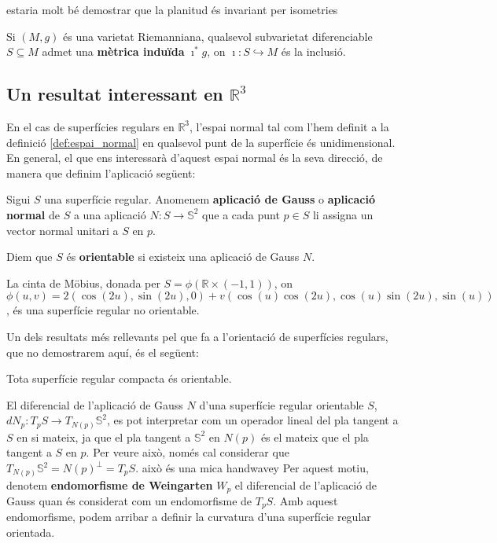 {\color{blue} estaria molt bé demostrar que la planitud és invariant per isometries}

Si $(M,g)$ és una varietat Riemanniana, qualsevol subvarietat diferenciable $S\subseteq M$ admet una \textbf{mètrica induïda} $\imath^*g$, on $\imath:S\hookrightarrow M$ és la inclusió.


\subsection{Un resultat interessant en $\mathbb R^3$}

En el cas de superfícies regulars en $\mathbb R^3$, l'espai normal tal com l'hem definit a la definició \ref{def:espai_normal} en qualsevol punt de la superfície és unidimensional. En general, el que ens interessarà d'aquest espai normal és la seva direcció, de manera que definim l'aplicació següent:
\begin{defi}
    Sigui $S$ una superfície regular. Anomenem \textbf{aplicació de Gauss} o \textbf{aplicació normal} de $S$ a una aplicació $N:S\to \mathbb S^2$ que a cada punt $p\in S$ li assigna un vector normal unitari a $S$ en $p$.
\end{defi}
Diem que $S$ és \textbf{orientable} si existeix una aplicació de Gauss $N$.
\begin{ex}
    La cinta de Möbius, donada per $S=\phi(\mathbb R \times (-1,1))$, on $\phi(u,v) = 2(\cos(2u), \sin(2u), 0) + v(\cos(u)\cos(2u), \cos(u)\sin(2u), \sin(u))$, és una superfície regular no orientable.
\end{ex}
Un dels resultats més rellevants pel que fa a l'orientació de superfícies regulars, que no demostrarem aquí, és el següent:
\begin{teo}
    Tota superfície regular compacta és orientable.
\end{teo}

El diferencial de l'aplicació de Gauss $N$ d'una superfície regular orientable $S$, $dN_p:T_pS\to T_{N(p)}\mathbb S^2$, es pot interpretar com un operador lineal del pla tangent a $S$ en si mateix, ja que el pla tangent a $\mathbb S^2$ en $N(p)$ és el mateix que el pla tangent a $S$ en $p$. Per veure això, només cal considerar que $T_{N(p)}\mathbb S^2 = N(p)^\perp = T_pS$.{\color{blue} això és una mica handwavey} Per aquest motiu, denotem \textbf{endomorfisme de Weingarten} $W_p$ el diferencial de l'aplicació de Gauss quan és considerat com un endomorfisme de $T_pS$. Amb aquest endomorfisme, podem arribar a definir la curvatura d'una superfície regular orientada.

